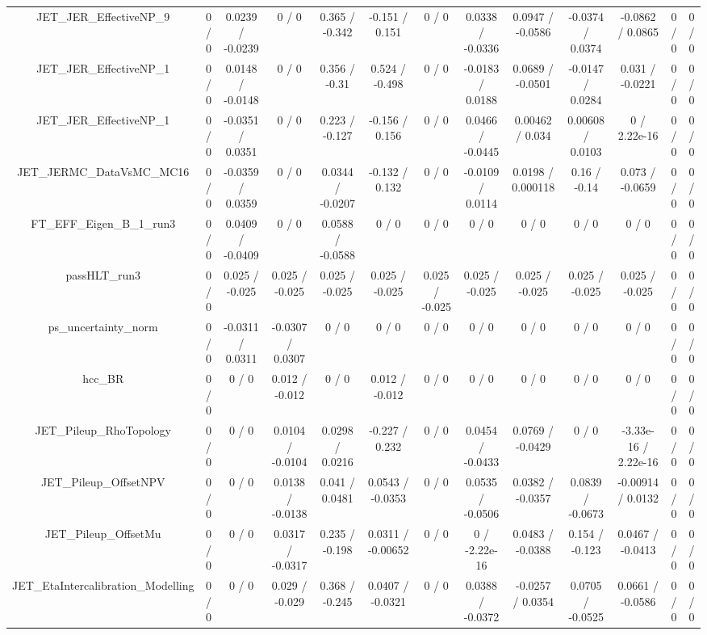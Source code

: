\documentclass[10pt]{article}
\begin{document}
\begin{table}[htbp]
\begin{center}
\begin{tabular}{|c|c|c|c|c|c|c|c|c|c|c|c|c|}
  JET_JER_EffectiveNP_9 & 0 / 0 & 0.0239 / -0.0239 & 0 / 0 & 0.365 / -0.342 & -0.151 / 0.151 & 0 / 0 & 0.0338 / -0.0336 & 0.0947 / -0.0586 & -0.0374 / 0.0374 & -0.0862 / 0.0865 & 0 / 0 & 0 / 0 \\ 
  JET_JER_EffectiveNP_1 & 0 / 0 & 0.0148 / -0.0148 & 0 / 0 & 0.356 / -0.31 & 0.524 / -0.498 & 0 / 0 & -0.0183 / 0.0188 & 0.0689 / -0.0501 & -0.0147 / 0.0284 & 0.031 / -0.0221 & 0 / 0 & 0 / 0 \\ 
  JET_JER_EffectiveNP_1 & 0 / 0 & -0.0351 / 0.0351 & 0 / 0 & 0.223 / -0.127 & -0.156 / 0.156 & 0 / 0 & 0.0466 / -0.0445 & 0.00462 / 0.034 & 0.00608 / 0.0103 & 0 / 2.22e-16 & 0 / 0 & 0 / 0 \\ 
  JET_JERMC_DataVsMC_MC16 & 0 / 0 & -0.0359 / 0.0359 & 0 / 0 & 0.0344 / -0.0207 & -0.132 / 0.132 & 0 / 0 & -0.0109 / 0.0114 & 0.0198 / 0.000118 & 0.16 / -0.14 & 0.073 / -0.0659 & 0 / 0 & 0 / 0 \\ 
  FT_EFF_Eigen_B_1_run3 & 0 / 0 & 0.0409 / -0.0409 & 0 / 0 & 0.0588 / -0.0588 & 0 / 0 & 0 / 0 & 0 / 0 & 0 / 0 & 0 / 0 & 0 / 0 & 0 / 0 & 0 / 0 \\ 
  passHLT_run3 & 0 / 0 & 0.025 / -0.025 & 0.025 / -0.025 & 0.025 / -0.025 & 0.025 / -0.025 & 0.025 / -0.025 & 0.025 / -0.025 & 0.025 / -0.025 & 0.025 / -0.025 & 0.025 / -0.025 & 0 / 0 & 0 / 0 \\ 
  ps_uncertainty_norm & 0 / 0 & -0.0311 / 0.0311 & -0.0307 / 0.0307 & 0 / 0 & 0 / 0 & 0 / 0 & 0 / 0 & 0 / 0 & 0 / 0 & 0 / 0 & 0 / 0 & 0 / 0 \\ 
  hcc_BR & 0 / 0 & 0 / 0 & 0.012 / -0.012 & 0 / 0 & 0.012 / -0.012 & 0 / 0 & 0 / 0 & 0 / 0 & 0 / 0 & 0 / 0 & 0 / 0 & 0 / 0 \\ 
  JET_Pileup_RhoTopology & 0 / 0 & 0 / 0 & 0.0104 / -0.0104 & 0.0298 / 0.0216 & -0.227 / 0.232 & 0 / 0 & 0.0454 / -0.0433 & 0.0769 / -0.0429 & 0 / 0 & -3.33e-16 / 2.22e-16 & 0 / 0 & 0 / 0 \\ 
  JET_Pileup_OffsetNPV & 0 / 0 & 0 / 0 & 0.0138 / -0.0138 & 0.041 / 0.0481 & 0.0543 / -0.0353 & 0 / 0 & 0.0535 / -0.0506 & 0.0382 / -0.0357 & 0.0839 / -0.0673 & -0.00914 / 0.0132 & 0 / 0 & 0 / 0 \\ 
  JET_Pileup_OffsetMu & 0 / 0 & 0 / 0 & 0.0317 / -0.0317 & 0.235 / -0.198 & 0.0311 / -0.00652 & 0 / 0 & 0 / -2.22e-16 & 0.0483 / -0.0388 & 0.154 / -0.123 & 0.0467 / -0.0413 & 0 / 0 & 0 / 0 \\ 
  JET_EtaIntercalibration_Modelling & 0 / 0 & 0 / 0 & 0.029 / -0.029 & 0.368 / -0.245 & 0.0407 / -0.0321 & 0 / 0 & 0.0388 / -0.0372 & -0.0257 / 0.0354 & 0.0705 / -0.0525 & 0.0661 / -0.0586 & 0 / 0 & 0 / 0 \\ 

\end{tabular}
\end{center}
\end{table}
\end{document}
